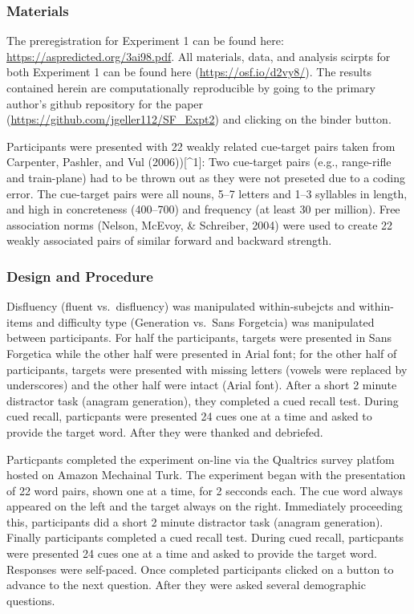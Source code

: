 \documentclass[english,doc]{apa6}
\begin{document}
\hypertarget{materials}{%
\subsubsection{Materials}\label{materials}}

The preregistration for Experiment 1 can be found here: \url{https://aspredicted.org/3ai98.pdf}. All materials, data, and analysis scirpts for both Experiment 1 can be found here (\url{https://osf.io/d2vy8/}). The results contained herein are computationally reproducible by going to the primary author's github repository for the paper (\url{https://github.com/jgeller112/SF_Expt2}) and clicking on the binder button.

Participants were presented with 22 weakly related cue-target pairs taken from Carpenter, Pashler, and Vul (2006)){[}\^{}1{]}: Two cue-target pairs (e.g., range-rifle and train-plane) had to be thrown out as they were not preseted due to a coding error. The cue-target pairs were all nouns, 5--7 letters and 1--3 syllables in length, and high in concreteness (400--700) and frequency (at least 30 per million). Free association norms (Nelson, McEvoy, \& Schreiber, 2004) were used to create 22 weakly associated pairs of similar forward and backward strength.

\hypertarget{design-and-procedure}{%
\subsubsection{Design and Procedure}\label{design-and-procedure}}

Disfluency (fluent vs.~disfluency) was manipulated within-subejcts and within-items and difficulty type (Generation vs.~Sans Forgetcia) was manipulated between participants. For half the participants, targets were presented in Sans Forgetica while the other half were presented in Arial font; for the other half of participants, targets were presented with missing letters (vowels were replaced by underscores) and the other half were intact (Arial font). After a short 2 minute distractor task (anagram generation), they completed a cued recall test. During cued recall, particpants were presented 24 cues one at a time and asked to provide the target word. After they were thanked and debriefed.

Particpants completed the experiment on-line via the Qualtrics survey platfom hosted on Amazon Mechainal Turk. The experiment began with the presentation of 22 word pairs, shown one at a time, for 2 secconds each. The cue word always appeared on the left and the target always on the right. Immediately proceeding this, participants did a short 2 minute distractor task (anagram generation). Finally participants completed a cued recall test. During cued recall, particpants were presented 24 cues one at a time and asked to provide the target word. Responses were self-paced. Once completed participants clicked on a button to advance to the next question. After they were asked several demographic questions.
\end{document}
